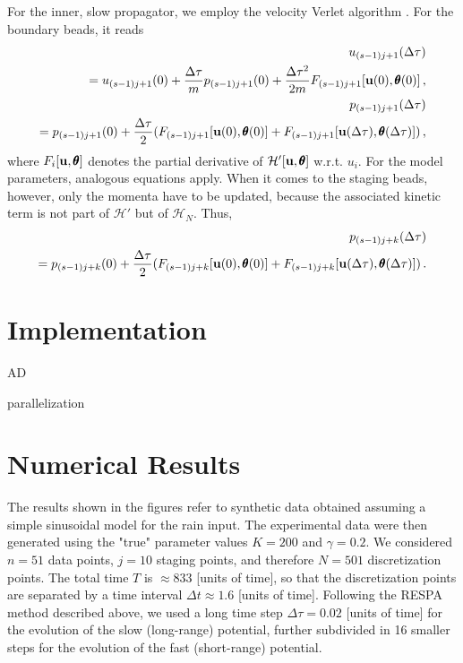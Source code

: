 \documentclass[12pt,a4paper,final]{iopart}
\newcommand{\vc}[1]{{\bf #1 }}
\begin{document}
For the inner, slow propagator, we employ the velocity Verlet algorithm \cite{Swope_1982_Verlet}.
For the boundary beads, it reads
\begin{eqnarray}
  u_{(s-1)j+1}(\Delta\tau) \nonumber \\
  = u_{(s-1)j+1}(0)
  +
  \frac{\Delta\tau}{m} p_{(s-1)j+1}(0)
  +
  \frac{\Delta \tau^2}{2m}
  F_{(s-1)j+1}[\vc u(0),{\pmb\theta}(0)]\,,\\
  p_{(s-1)j+1}(\Delta\tau) \nonumber \\
  = p_{(s-1)j+1}(0)
  +
  \frac{\Delta\tau}{2}
  (
  F_{(s-1)j+1}[\vc u(0),{\pmb\theta}(0)]
  +
  F_{(s-1)j+1}[\vc u(\Delta\tau),{\pmb\theta}(\Delta\tau)]
  )\,,
\end{eqnarray}
where $F_i[\vc u,{\pmb\theta}]$ denotes the partial derivative of $\mathcal H'[\vc u,{\pmb\theta}]$ w.r.t. $u_i$.
For the model parameters, analogous equations apply.
When it comes to the staging beads, however, only the momenta have to be updated, because the associated kinetic term is not part of $\mathcal H'$ but of $\mathcal H_N$.
Thus,
\begin{eqnarray}
  p_{(s-1)j+k}(\Delta\tau) \nonumber \\
  =
  p_{(s-1)j+k}(0)
  +
  \frac{\Delta\tau}{2}
  (
  F_{(s-1)j+k}[\vc u(0),{\pmb\theta}(0)]
  +
  F_{(s-1)j+k}[\vc u(\Delta\tau),{\pmb\theta}(\Delta\tau)]
  )
  \,.
\end{eqnarray}


\section{Implementation}

AD

parallelization

\section{Numerical Results}

The results shown in the figures refer to synthetic data obtained assuming a simple sinusoidal model for the rain input. The experimental data were then generated using the "true" parameter values $K=200$ and $\gamma = 0.2$. We considered $n=51$ data points, $j=10$ staging points, and therefore $N=501$ discretization points. The total time $T$ is $\approx 833$ [units of time], so that the discretization points are separated by a time interval $\Delta t \approx 1.6 $ [units of time]. Following the RESPA method described above, we used a long time step $\Delta \tau = 0.02$ [units of time] for the evolution of the slow (long-range) potential, further subdivided in 16 smaller steps for the evolution of the fast (short-range) potential.
\end{document}
